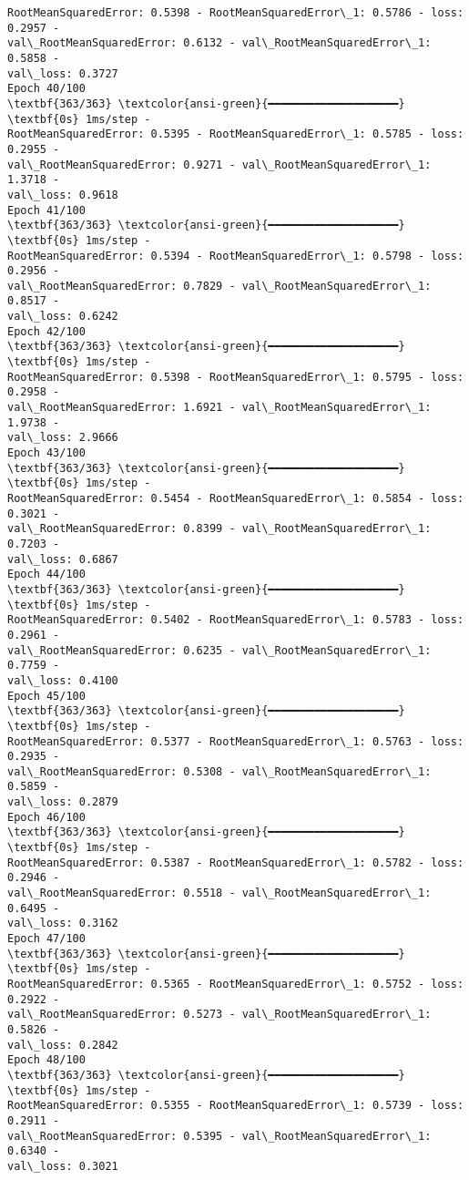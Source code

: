 \documentclass[12pt letter]{report}
\begin{document}
\begin{Verbatim}[commandchars=\\\{\}]
RootMeanSquaredError: 0.5398 - RootMeanSquaredError\_1: 0.5786 - loss: 0.2957 -
val\_RootMeanSquaredError: 0.6132 - val\_RootMeanSquaredError\_1: 0.5858 -
val\_loss: 0.3727
Epoch 40/100
\textbf{363/363} \textcolor{ansi-green}{━━━━━━━━━━━━━━━━━━━━} \textbf{0s} 1ms/step -
RootMeanSquaredError: 0.5395 - RootMeanSquaredError\_1: 0.5785 - loss: 0.2955 -
val\_RootMeanSquaredError: 0.9271 - val\_RootMeanSquaredError\_1: 1.3718 -
val\_loss: 0.9618
Epoch 41/100
\textbf{363/363} \textcolor{ansi-green}{━━━━━━━━━━━━━━━━━━━━} \textbf{0s} 1ms/step -
RootMeanSquaredError: 0.5394 - RootMeanSquaredError\_1: 0.5798 - loss: 0.2956 -
val\_RootMeanSquaredError: 0.7829 - val\_RootMeanSquaredError\_1: 0.8517 -
val\_loss: 0.6242
Epoch 42/100
\textbf{363/363} \textcolor{ansi-green}{━━━━━━━━━━━━━━━━━━━━} \textbf{0s} 1ms/step -
RootMeanSquaredError: 0.5398 - RootMeanSquaredError\_1: 0.5795 - loss: 0.2958 -
val\_RootMeanSquaredError: 1.6921 - val\_RootMeanSquaredError\_1: 1.9738 -
val\_loss: 2.9666
Epoch 43/100
\textbf{363/363} \textcolor{ansi-green}{━━━━━━━━━━━━━━━━━━━━} \textbf{0s} 1ms/step -
RootMeanSquaredError: 0.5454 - RootMeanSquaredError\_1: 0.5854 - loss: 0.3021 -
val\_RootMeanSquaredError: 0.8399 - val\_RootMeanSquaredError\_1: 0.7203 -
val\_loss: 0.6867
Epoch 44/100
\textbf{363/363} \textcolor{ansi-green}{━━━━━━━━━━━━━━━━━━━━} \textbf{0s} 1ms/step -
RootMeanSquaredError: 0.5402 - RootMeanSquaredError\_1: 0.5783 - loss: 0.2961 -
val\_RootMeanSquaredError: 0.6235 - val\_RootMeanSquaredError\_1: 0.7759 -
val\_loss: 0.4100
Epoch 45/100
\textbf{363/363} \textcolor{ansi-green}{━━━━━━━━━━━━━━━━━━━━} \textbf{0s} 1ms/step -
RootMeanSquaredError: 0.5377 - RootMeanSquaredError\_1: 0.5763 - loss: 0.2935 -
val\_RootMeanSquaredError: 0.5308 - val\_RootMeanSquaredError\_1: 0.5859 -
val\_loss: 0.2879
Epoch 46/100
\textbf{363/363} \textcolor{ansi-green}{━━━━━━━━━━━━━━━━━━━━} \textbf{0s} 1ms/step -
RootMeanSquaredError: 0.5387 - RootMeanSquaredError\_1: 0.5782 - loss: 0.2946 -
val\_RootMeanSquaredError: 0.5518 - val\_RootMeanSquaredError\_1: 0.6495 -
val\_loss: 0.3162
Epoch 47/100
\textbf{363/363} \textcolor{ansi-green}{━━━━━━━━━━━━━━━━━━━━} \textbf{0s} 1ms/step -
RootMeanSquaredError: 0.5365 - RootMeanSquaredError\_1: 0.5752 - loss: 0.2922 -
val\_RootMeanSquaredError: 0.5273 - val\_RootMeanSquaredError\_1: 0.5826 -
val\_loss: 0.2842
Epoch 48/100
\textbf{363/363} \textcolor{ansi-green}{━━━━━━━━━━━━━━━━━━━━} \textbf{0s} 1ms/step -
RootMeanSquaredError: 0.5355 - RootMeanSquaredError\_1: 0.5739 - loss: 0.2911 -
val\_RootMeanSquaredError: 0.5395 - val\_RootMeanSquaredError\_1: 0.6340 -
val\_loss: 0.3021

\end{Verbatim}
\end{document}
